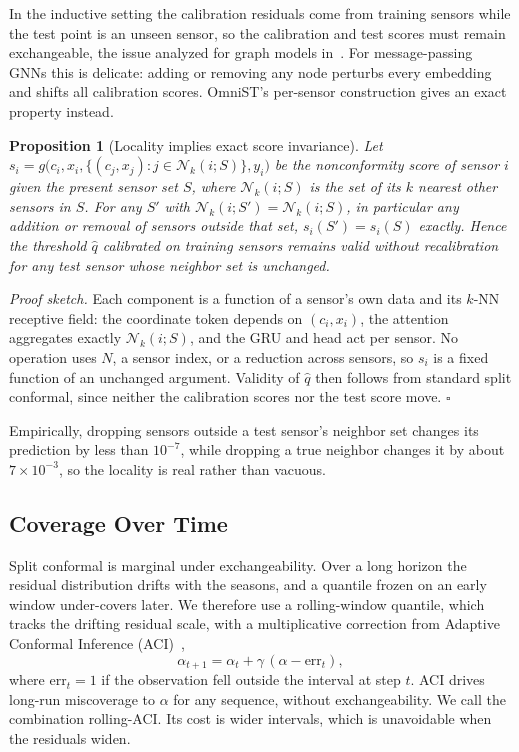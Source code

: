 \documentclass[journal,twoside,web]{ieeecolor}
\newtheorem{proposition}{Proposition}
\begin{document}
In the inductive setting the calibration residuals come from training sensors while the test point
is an unseen sensor, so the calibration and test scores must remain exchangeable, the issue analyzed
for graph models in~\cite{conformalinductivegnn2024}. For message-passing GNNs this is delicate:
adding or removing any node perturbs every embedding and shifts all calibration scores. OmniST's
per-sensor construction gives an exact property instead.

\begin{proposition}[Locality implies exact score invariance]
\label{prop:locality}
Let $s_i = g\big(c_i, x_i, \{(c_j,x_j): j\in\mathcal{N}_k(i;S)\}, y_i\big)$ be the nonconformity
score of sensor $i$ given the present sensor set $S$, where $\mathcal{N}_k(i;S)$ is the set of its $k$
nearest other sensors in $S$. For any $S'$ with $\mathcal{N}_k(i;S') = \mathcal{N}_k(i;S)$, in
particular any addition or removal of sensors outside that set, $s_i(S') = s_i(S)$ exactly. Hence the
threshold $\hat q$ calibrated on training sensors remains valid without recalibration for any test
sensor whose neighbor set is unchanged.
\end{proposition}

\emph{Proof sketch.} Each component is a function of a sensor's own data and its $k$-NN receptive
field: the coordinate token depends on $(c_i,x_i)$, the attention aggregates exactly
$\mathcal{N}_k(i;S)$, and the GRU and head act per sensor. No operation uses $N$, a sensor index, or a
reduction across sensors, so $s_i$ is a fixed function of an unchanged argument. Validity of $\hat q$
then follows from standard split conformal, since neither the calibration scores nor the test score
move. $\square$

Empirically, dropping sensors outside a test sensor's neighbor set changes its prediction by less
than $10^{-7}$, while dropping a true neighbor changes it by about $7\times10^{-3}$, so the locality is
real rather than vacuous.

\subsection{Coverage Over Time}
\label{sec:online-conformal}

Split conformal is marginal under exchangeability. Over a long horizon the residual distribution
drifts with the seasons, and a quantile frozen on an early window under-covers later. We therefore
use a rolling-window quantile, which tracks the drifting residual scale, with a multiplicative
correction from Adaptive Conformal Inference (ACI)~\cite{gibbs2021aci},
\begin{equation}
\alpha_{t+1} = \alpha_t + \gamma\,(\alpha - \mathrm{err}_t),
\end{equation}
where $\mathrm{err}_t=1$ if the observation fell outside the interval at step $t$. ACI drives
long-run miscoverage to $\alpha$ for any sequence, without exchangeability. We call the combination
rolling-ACI. Its cost is wider intervals, which is unavoidable when the residuals widen.
\end{document}
